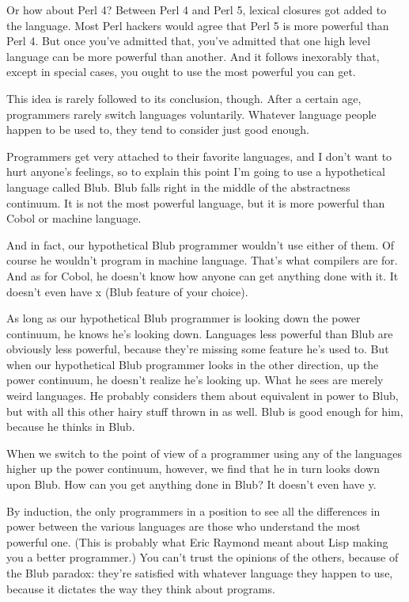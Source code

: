 Or how about Perl 4? Between Perl 4 and Perl 5, lexical closures got
added to the language. Most Perl hackers would agree that Perl 5 is more
powerful than Perl 4. But once you've admitted that, you've admitted
that one high level language can be more powerful than another. And it
follows inexorably that, except in special cases, you ought to use the
most powerful you can get.

This idea is rarely followed to its conclusion, though. After a certain
age, programmers rarely switch languages voluntarily. Whatever language
people happen to be used to, they tend to consider just good enough.

Programmers get very attached to their favorite languages, and I don't
want to hurt anyone's feelings, so to explain this point I'm going to
use a hypothetical language called Blub. Blub falls right in the middle
of the abstractness continuum. It is not the most powerful language, but
it is more powerful than Cobol or machine language.

And in fact, our hypothetical Blub programmer wouldn't use either of
them. Of course he wouldn't program in machine language. That's what
compilers are for. And as for Cobol, he doesn't know how anyone can get
anything done with it. It doesn't even have x (Blub feature of your
choice).

As long as our hypothetical Blub programmer is looking down the power
continuum, he knows he's looking down. Languages less powerful than Blub
are obviously less powerful, because they're missing some feature he's
used to. But when our hypothetical Blub programmer looks in the other
direction, up the power continuum, he doesn't realize he's looking up.
What he sees are merely weird languages. He probably considers them
about equivalent in power to Blub, but with all this other hairy stuff
thrown in as well. Blub is good enough for him, because he thinks in
Blub.

When we switch to the point of view of a programmer using any of the
languages higher up the power continuum, however, we find that he in
turn looks down upon Blub. How can you get anything done in Blub? It
doesn't even have y.

By induction, the only programmers in a position to see all the
differences in power between the various languages are those who
understand the most powerful one. (This is probably what Eric Raymond
meant about Lisp making you a better programmer.) You can't trust the
opinions of the others, because of the Blub paradox: they're satisfied
with whatever language they happen to use, because it dictates the way
they think about programs.

